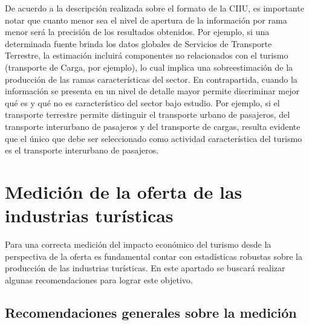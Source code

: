 \documentclass[
  openany]{book}
\begin{document}
De acuerdo a la descripción realizada sobre el formato de la CIIU, es importante notar que cuanto menor sea el nivel de apertura de la información por rama menor será la precisión de los resultados obtenidos. Por ejemplo, si una determinada fuente brinda los datos globales de Servicios de Transporte Terrestre, la estimación incluirá componentes no relacionados con el turismo (transporte de Carga, por ejemplo), lo cual implica una sobreestimación de la producción de las ramas características del sector. En contrapartida, cuando la información se presenta en un nivel de detalle mayor permite discriminar mejor qué es y qué no es característico del sector bajo estudio. Por ejemplo, si el transporte terrestre permite distinguir el transporte urbano de pasajeros, del transporte interurbano de pasajeros y del transporte de cargas, resulta evidente que el único que debe ser seleccionado como actividad característica del turismo es el transporte interurbano de pasajeros.

\hypertarget{mediciuxf3n-de-la-oferta-de-las-industrias-turuxedsticas}{%
\section{Medición de la oferta de las industrias turísticas}\label{mediciuxf3n-de-la-oferta-de-las-industrias-turuxedsticas}}

Para una correcta medición del impacto económico del turismo desde la perspectiva de la oferta es fundamental contar con estadísticas robustas sobre la producción de las industrias turísticas. En este apartado se buscará realizar algunas recomendaciones para lograr este objetivo.

\hypertarget{recomendaciones-generales-sobre-la-mediciuxf3n}{%
\subsection{Recomendaciones generales sobre la medición}\label{recomendaciones-generales-sobre-la-mediciuxf3n}}
\end{document}
